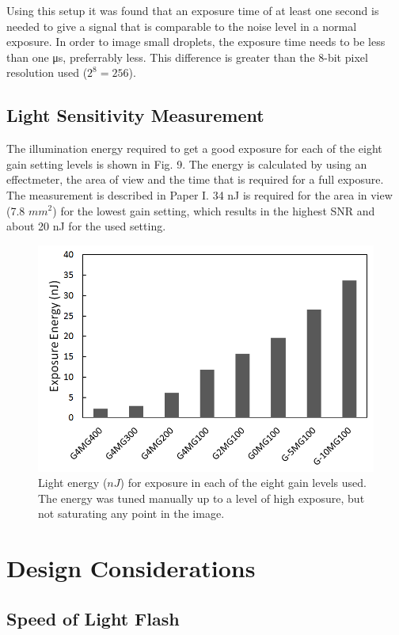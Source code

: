 Using this setup it was found that an exposure time of at least one second is needed to give a signal that is comparable to the noise level in a normal exposure. In order to image small droplets, the exposure time needs to be less than one μs, preferrably less. This difference is greater than the 8-bit pixel resolution used ($2^8=256$).

\subsection{Light Sensitivity Measurement}

The illumination energy required to get a good exposure for each of the eight gain setting levels is shown in Fig. 9. The energy is calculated by using an effectmeter, the area of view and the time that is required for a full exposure. The measurement is described in Paper I. 34 nJ is required for the area in view (7.8 $mm^2$) for the lowest gain setting, which results in the highest SNR and about 20 nJ for the used setting. 

\begin{figure}[ht]
\centering\includegraphics[width=0.75\linewidth]{figures/Energy_per_gain_level2}
\caption{Light energy ($nJ$) for exposure in each of the eight gain levels used. The energy was tuned manually up to a level of high exposure, but not saturating any point in the image.}
\end{figure}


\section{Design Considerations}

\subsection{Speed of Light Flash}

